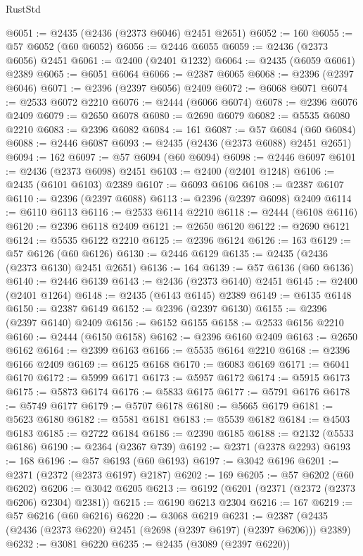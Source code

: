 \begin{lexlean}{RustStd}
\begin{coremodule}
@6051 := @2435 (@2436 (@2373 @6046) @2451 @2651)
@6052 := 160
@6055 := @57 @6052 (@60 @6052)
@6056 := @2446 @6055
@6059 := @2436 (@2373 @6056) @2451
@6061 := @2400 (@2401 @1232)
@6064 := @2435 (@6059 @6061) @2389
@6065 := @6051 @6064
@6066 := @2387 @6065
@6068 := @2396 (@2397 @6046)
@6071 := @2396 (@2397 @6056) @2409
@6072 := @6068 @6071
@6074 := @2533 @6072 @2210
@6076 := @2444 (@6066 @6074)
@6078 := @2396 @6076 @2409
@6079 := @2650 @6078
@6080 := @2690 @6079
@6082 := @5535 @6080 @2210
@6083 := @2396 @6082
@6084 := 161
@6087 := @57 @6084 (@60 @6084)
@6088 := @2446 @6087
@6093 := @2435 (@2436 (@2373 @6088) @2451 @2651)
@6094 := 162
@6097 := @57 @6094 (@60 @6094)
@6098 := @2446 @6097
@6101 := @2436 (@2373 @6098) @2451
@6103 := @2400 (@2401 @1248)
@6106 := @2435 (@6101 @6103) @2389
@6107 := @6093 @6106
@6108 := @2387 @6107
@6110 := @2396 (@2397 @6088)
@6113 := @2396 (@2397 @6098) @2409
@6114 := @6110 @6113
@6116 := @2533 @6114 @2210
@6118 := @2444 (@6108 @6116)
@6120 := @2396 @6118 @2409
@6121 := @2650 @6120
@6122 := @2690 @6121
@6124 := @5535 @6122 @2210
@6125 := @2396 @6124
@6126 := 163
@6129 := @57 @6126 (@60 @6126)
@6130 := @2446 @6129
@6135 := @2435 (@2436 (@2373 @6130) @2451 @2651)
@6136 := 164
@6139 := @57 @6136 (@60 @6136)
@6140 := @2446 @6139
@6143 := @2436 (@2373 @6140) @2451
@6145 := @2400 (@2401 @1264)
@6148 := @2435 (@6143 @6145) @2389
@6149 := @6135 @6148
@6150 := @2387 @6149
@6152 := @2396 (@2397 @6130)
@6155 := @2396 (@2397 @6140) @2409
@6156 := @6152 @6155
@6158 := @2533 @6156 @2210
@6160 := @2444 (@6150 @6158)
@6162 := @2396 @6160 @2409
@6163 := @2650 @6162
@6164 := @2399 @6163
@6166 := @5535 @6164 @2210
@6168 := @2396 @6166 @2409
@6169 := @6125 @6168
@6170 := @6083 @6169
@6171 := @6041 @6170
@6172 := @5999 @6171
@6173 := @5957 @6172
@6174 := @5915 @6173
@6175 := @5873 @6174
@6176 := @5833 @6175
@6177 := @5791 @6176
@6178 := @5749 @6177
@6179 := @5707 @6178
@6180 := @5665 @6179
@6181 := @5623 @6180
@6182 := @5581 @6181
@6183 := @5539 @6182
@6184 := @4503 @6183
@6185 := @2722 @6184
@6186 := @2390 @6185
@6188 := @2132 (@5533 @6186)
@6190 := @2364 (@2367 @739)
@6192 := @2371 (@2378 @2293)
@6193 := 168
@6196 := @57 @6193 (@60 @6193)
@6197 := @3042 @6196
@6201 := @2371 (@2372 (@2373 @6197) @2187)
@6202 := 169
@6205 := @57 @6202 (@60 @6202)
@6206 := @3042 @6205
@6213 := @6192 (@6201 (@2371 (@2372 (@2373 @6206) @2304) @2381))
@6215 := @6190 @6213 @2304
@6216 := 167
@6219 := @57 @6216 (@60 @6216)
@6220 := @3068 @6219
@6231 := @2387 (@2435 (@2436 (@2373 @6220) @2451 (@2698 (@2397 @6197) (@2397 @6206))) @2389)
@6232 := @3081 @6220
@6235 := @2435 (@3089 (@2397 @6220))

\end{coremodule}
\end{lexlean}
